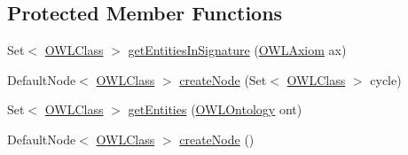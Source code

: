 \subsection*{Protected Member Functions}
\begin{DoxyCompactItemize}
\item 
Set$<$ \hyperlink{interfaceorg_1_1semanticweb_1_1owlapi_1_1model_1_1_o_w_l_class}{O\-W\-L\-Class} $>$ \hyperlink{classorg_1_1semanticweb_1_1owlapi_1_1reasoner_1_1structural_1_1_structural_reasoner_1_1_class_hierarchy_info_a79e53579f2b1e2f67ed4f6e4bb9c998c}{get\-Entities\-In\-Signature} (\hyperlink{interfaceorg_1_1semanticweb_1_1owlapi_1_1model_1_1_o_w_l_axiom}{O\-W\-L\-Axiom} ax)
\item 
Default\-Node$<$ \hyperlink{interfaceorg_1_1semanticweb_1_1owlapi_1_1model_1_1_o_w_l_class}{O\-W\-L\-Class} $>$ \hyperlink{classorg_1_1semanticweb_1_1owlapi_1_1reasoner_1_1structural_1_1_structural_reasoner_1_1_class_hierarchy_info_a7352cd5f898f21a9c64f2ea32ba526dd}{create\-Node} (Set$<$ \hyperlink{interfaceorg_1_1semanticweb_1_1owlapi_1_1model_1_1_o_w_l_class}{O\-W\-L\-Class} $>$ cycle)
\item 
Set$<$ \hyperlink{interfaceorg_1_1semanticweb_1_1owlapi_1_1model_1_1_o_w_l_class}{O\-W\-L\-Class} $>$ \hyperlink{classorg_1_1semanticweb_1_1owlapi_1_1reasoner_1_1structural_1_1_structural_reasoner_1_1_class_hierarchy_info_a7bb88888af5f4651f510ef708358e9e9}{get\-Entities} (\hyperlink{interfaceorg_1_1semanticweb_1_1owlapi_1_1model_1_1_o_w_l_ontology}{O\-W\-L\-Ontology} ont)
\item 
Default\-Node$<$ \hyperlink{interfaceorg_1_1semanticweb_1_1owlapi_1_1model_1_1_o_w_l_class}{O\-W\-L\-Class} $>$ \hyperlink{classorg_1_1semanticweb_1_1owlapi_1_1reasoner_1_1structural_1_1_structural_reasoner_1_1_class_hierarchy_info_ab0213f7bf96e19c7db81ff8ce812e950}{create\-Node} ()
\end{DoxyCompactItemize}


